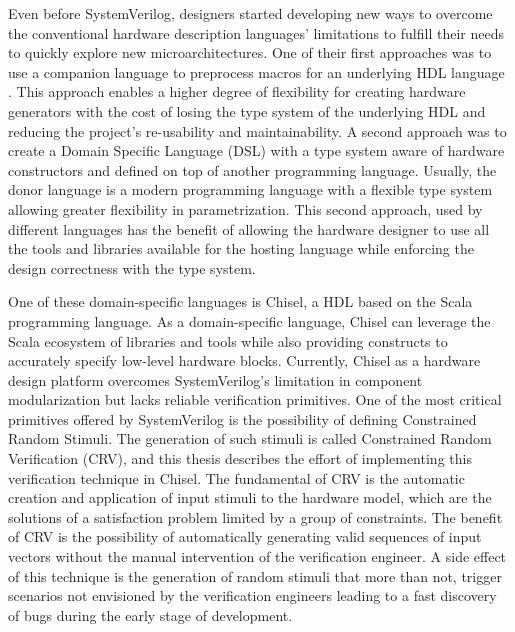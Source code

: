 Even before SystemVerilog, designers started developing new ways to overcome the
conventional hardware description languages' limitations to fulfill their needs
to quickly explore new microarchitectures. One of their first approaches was to
use a companion language to preprocess macros for an underlying HDL language
\cite{bachrach2012chisel}. This approach enables a higher degree of flexibility
for creating hardware generators with the cost of losing the type system of the
underlying HDL and reducing the project's re-usability and maintainability. A
second approach was to create a Domain Specific Language (DSL) with a type
system aware of hardware constructors and defined on top of another programming
language. Usually, the donor language is a modern programming language with a
flexible type system allowing greater flexibility in parametrization. This
second approach, used by different languages \cite{bachrach2012chisel,
  github:kratos, github:hwt} has the benefit of allowing the hardware designer
to use all the tools and libraries available for the hosting language while
enforcing the design correctness with the type system.

One of these domain-specific languages is Chisel, a HDL based on the Scala
programming language. As a domain-specific language, Chisel can leverage the
Scala ecosystem of libraries and tools while also providing constructs to
accurately specify low-level hardware blocks. Currently, Chisel as a hardware
design platform overcomes SystemVerilog's limitation in component modularization
but lacks reliable verification primitives. One of the most critical primitives
offered by SystemVerilog is the possibility of defining Constrained Random
Stimuli. The generation of such stimuli is called Constrained Random
Verification (CRV), and this thesis describes the effort of implementing this
verification technique in Chisel. The fundamental of CRV is the automatic
creation and application of input stimuli to the hardware model, which are the
solutions of a satisfaction problem limited by a group of constraints. The
benefit of CRV is the possibility of automatically generating valid sequences of
input vectors without the manual intervention of the verification engineer. A
side effect of this technique is the generation of random stimuli that more than
not, trigger scenarios not envisioned by the verification engineers leading to a
fast discovery of bugs during the early stage of development.

